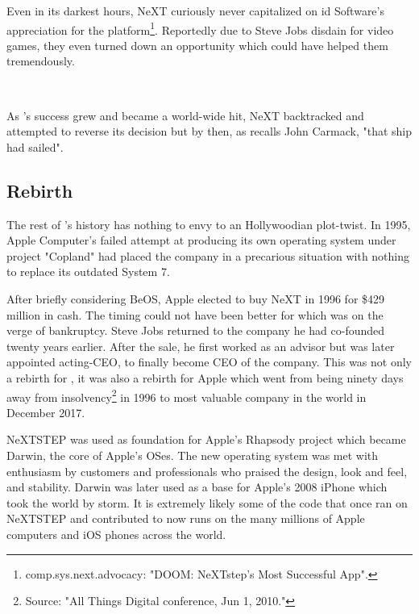 Even in its darkest hours, NeXT curiously never capitalized on id Software's appreciation for the platform\footnote{comp.sys.next.advocacy: "DOOM: NeXTstep's Most Successful App".}. Reportedly due to Steve Jobs disdain for video games, they even turned down an opportunity which could have helped them tremendously.\\
\par

\\
\par
{}
\par
\vspace{-10pt}
 As \doom{}'s success grew and became a world-wide hit, NeXT backtracked and attempted to reverse its decision but by then, as recalls John Carmack, "that ship had sailed".


\subsection{Rebirth}
The rest of \NeXTns's history has nothing to envy to an Hollywoodian plot-twist. In 1995, Apple Computer's failed attempt at producing its own operating system under project "Copland" had placed the company in a precarious situation with nothing to replace its outdated System 7.\\
\par
 After briefly considering BeOS, Apple elected to buy NeXT in 1996 for \$429 million in cash. The timing could not have been better for \NeXT which was on the verge of bankruptcy. Steve Jobs returned to the company he had co-founded twenty years earlier. After the sale, he first worked as an advisor but was later appointed acting-CEO, to finally become CEO of the company. This was not only a rebirth for \NeXTns, it was also a rebirth for Apple which went from being ninety days away from insolvency\footnote{Source: "All Things Digital conference, Jun 1, 2010."} in 1996 to most valuable company in the world in December 2017. \\
\par
NeXTSTEP was used as foundation for Apple's Rhapsody project which became Darwin, the core of Apple's OSes. The new operating system was met with enthusiasm by customers and professionals who praised the design, look and feel, and stability. Darwin was later used as a base for Apple's 2008 iPhone which took the world by storm. It is extremely likely some of the code that once ran on NeXTSTEP and contributed to \doom{} now runs on the many millions of Apple computers and iOS phones across the world.\\



